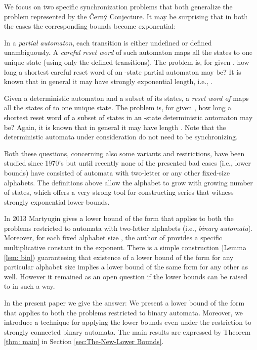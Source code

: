\documentclass{ws-ijmpc}
\begin{document}
We focus on two specific synchronization problems that both generalize
the problem represented by the \v{C}ern\'{y} Conjecture. It may be
surprising that in both the cases the corresponding bounds become
exponential:
\begin{itemlist}
\item In a \emph{partial automaton}, each transition is either undefined
or defined unambiguously. A\emph{ careful reset word} of such automaton
maps all the states to one unique state (using only the defined transitions).
The problem is, for given , how long a shortest careful reset
word of an -state partial automaton may be? It is known that in
general it may have strongly exponential length, i.e., .
\item Given a deterministic automaton and a subset  of its states, a
\emph{reset word of } maps all the states of  to one unique
state. The problem is, for given , how long a shortest reset word
of a subset of states in an -state deterministic automaton may
be? Again, it is known that in general it may have length .
Note that the deterministic automata under consideration do not need
to be synchronizing.
\end{itemlist}
Both these questions, concerning also some variants and restrictions,
have been studied since 1970's but until recently none of the presented
bad cases (i.e., lower bounds) have consisted of automata with two-letter
or any other fixed-size alphabets. The definitions above allow the
alphabet to grow with growing number of states, which offers a very
strong tool for constructing series that witness strongly exponential
lower bounds. 

In 2013 Martyugin \citep{MAR5} gives a lower bound of the form 
that applies to both the problems restricted to automata with two-letter
alphabets (i.e., \emph{binary automata}). Moreover, for each fixed
alphabet size , the author of \citep{MAR5} provides a specific
multiplicative constant in the exponent. There is a simple construction
(Lemma \ref{lem: bin}) guaranteeing that existence of a lower bound
of the form  for any particular alphabet
size  implies a lower bound of the same form for any other 
as well. However it remained as an open question if the lower bounds
can be raised to  in such a way.

In the present paper we give the answer: We present a lower bound
of the form  that applies to both the problems
restricted to binary automata. Moreover, we introduce a technique
for applying the lower bounds even under the restriction to strongly
connected binary automata. The main results are expressed by Theorem
\ref{thm: main} in Section \ref{sec:The-New-Lower Bounds}.
\end{document}
